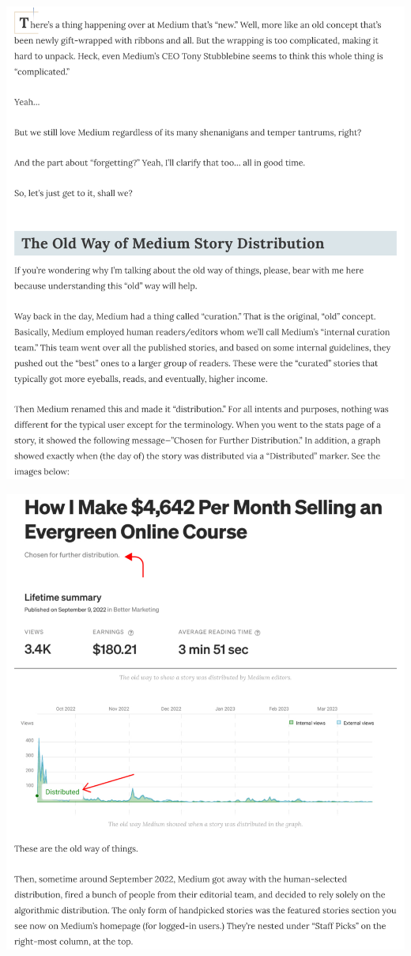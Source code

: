 \Continuing
\begin{center}
    \includegraphics[width=\textwidth]{thesideblogger-p2}
\end{center}
\WillContinue
\pagebreak

\Continuing
\begin{center}
    \includegraphics[width=\textwidth]{thesideblogger-p3}
\end{center}
\pagebreak


